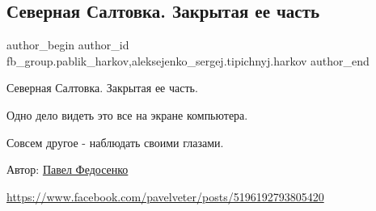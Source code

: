  
 
 
 
 
 
\subsection{Северная Салтовка. Закрытая ее часть}
\label{sec:15_05_2022.fb.fb_group.pablik_harkov.1.saltovka}
 
\ifcmt
 author_begin
   author_id fb_group.pablik_harkov,aleksejenko_sergej.tipichnyj.harkov
 author_end
\fi

Северная Салтовка. Закрытая ее часть. 

Одно дело видеть это все на экране компьютера.


Совсем другое - наблюдать своими глазами.

Автор: \href{https://www.facebook.com/pavelveter}{Павел Федосенко}

\url{https://www.facebook.com/pavelveter/posts/5196192793805420}

